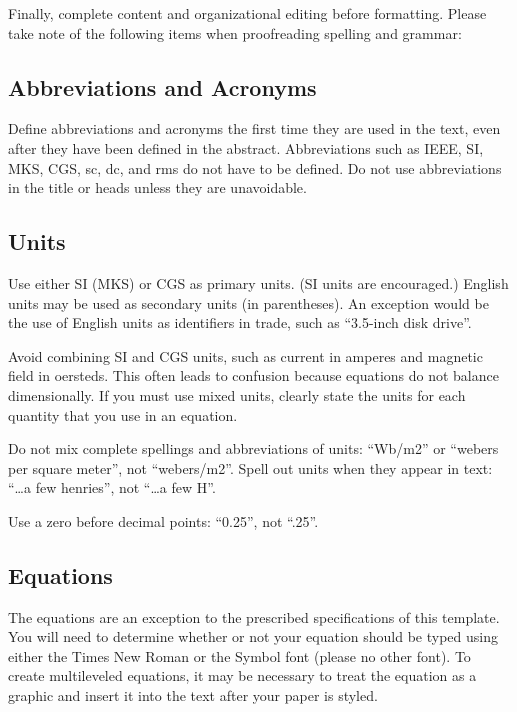 \documentclass[conference,a4paper,flushend]{neutr}
\begin{document}
Finally, complete content and organizational editing before formatting. Please take note of the following items when proofreading spelling and grammar:

\subsection{Abbreviations and Acronyms}
Define abbreviations and acronyms the first time they are used in the text, even after they have been defined in the abstract. Abbreviations such as IEEE, SI, MKS, CGS, sc, dc, and rms do not have to be defined. Do not use abbreviations in the title or heads unless they are unavoidable.

\subsection{Units}
\begin{compactitem}
\item Use either SI (MKS) or CGS as primary units. (SI units are encouraged.) English units may be used as secondary units (in parentheses). An exception would be the use of English units as identifiers in trade, such as “3.5-inch disk drive”.
\item Avoid combining SI and CGS units, such as current in amperes and magnetic field in oersteds. This often leads to confusion because equations do not balance dimensionally. If you must use mixed units, clearly state the units for each quantity that you use in an equation.
\item Do not mix complete spellings and abbreviations of units: “Wb/m2” or “webers per square meter”, not “webers/m2”.  Spell out units when they appear in text: “\ldots a few henries”, not “\ldots a few H”.
\item Use a zero before decimal points: “0.25”, not “.25”.
\end{compactitem}

\subsection{Equations}

The equations are an exception to the prescribed specifications of this template. You will need to determine whether or not your equation should be typed using either the Times New Roman or the Symbol font (please no other font). To create multileveled equations, it may be necessary to treat the equation as a graphic and insert it into the text after your paper is styled.
\end{document}
